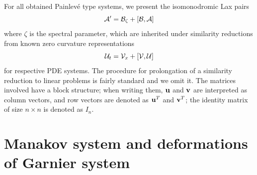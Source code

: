 \documentclass[11pt]{article}
\theoremstyle{plain}
\theoremstyle{definition}
\begin{document}
For all obtained Painlev\'e type systems, we present the isomonodromic Lax pairs 
\begin{equation}\label{AB-pair}
 {\cal A}'={\cal B}_\zeta+[{\cal B},{\cal A}]
\end{equation}
where $\zeta$ is the spectral parameter, which are inherited under similarity reductions from known zero curvature representations
\begin{equation}\label{UV-pair}
 {\cal U}_t={\cal V}_x+[{\cal V},{\cal U}]
\end{equation}
for respective PDE systems. The procedure for prolongation of a similarity reduction to linear problems is fairly standard and we omit it. The matrices involved have a block structure; when writing them, ${\bf u}$ and ${\bf v}$ are interpreted as column vectors, and row vectors are denoted as ${\bf u}^T$ and ${\bf v}^T$; the identity matrix of size $n\times n$ is denoted as $I_n$. 

\section{Manakov system and deformations of Garnier system}\label{s:Manakov}
\end{document}
